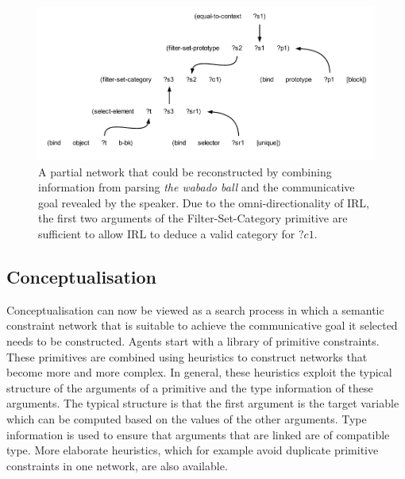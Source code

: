 \begin{figure}[t]
  \begin{center}
    \includegraphics[width=.9\textwidth]{./frameworks/figures/network-learning.pdf}
    \caption[Example constraint network during learning]{A partial
      network that could be reconstructed by combining information
      from parsing \textit{the wabado ball} and the communicative goal
      revealed by the speaker. Due to the omni-directionality of IRL,
      the first two arguments of the {\sc Filter-Set-Category}
      primitive are sufficient to allow IRL to deduce a valid category
      for $?c1$.}
    \label{f:network-learning}
  \end{center}
\end{figure}

\subsection{Conceptualisation}
\label{s:irl-conceptualisation}

Conceptualisation can now be viewed as a search process in which a
semantic constraint network that is suitable to achieve the
communicative goal it selected \citep{steels05planning} needs to be
constructed. Agents start with a library of primitive
constraints. These primitives are combined using heuristics to
construct networks that become more and more complex. In general,
these heuristics exploit the typical structure of the arguments of a
primitive and the type information of these arguments. The typical
structure is that the first argument is the target variable which can
be computed based on the values of the other arguments. Type
information is used to ensure that arguments that are linked are of
compatible type. More elaborate heuristics, which for example avoid
duplicate primitive constraints in one network, are also available.


